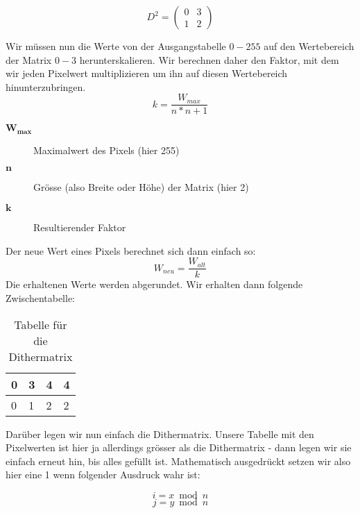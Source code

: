 \begin{displaymath}
D^2 = \begin{pmatrix}
0 & 3 \\
1 & 2
\end{pmatrix}
\end{displaymath}

Wir müssen nun die Werte von der Ausgangstabelle \(0-255\) auf den Wertebereich der Matrix \(0-3\) herunterskalieren. Wir berechnen daher den Faktor, mit dem wir jeden Pixelwert multiplizieren um ihn auf diesen Wertebereich hinunterzubringen.
\begin{displaymath}
k = \frac{W_{max}}{n*n+1}
\end{displaymath}

\begin{description}
	\item[\(\mathbf{W_{max}}\)] Maximalwert des Pixels (hier 255)
	\item[\(\mathbf{n}\)] Grösse (also Breite oder Höhe) der Matrix (hier 2)
	\item[\(\mathbf{k}\)] Resultierender Faktor
\end{description}
Der neue Wert eines Pixels berechnet sich dann einfach so:
\begin{displaymath}
    W_{neu} =  \frac{W_{alt}}{k}
\end{displaymath}
Die erhaltenen Werte werden abgerundet. Wir erhalten dann folgende Zwischentabelle:

\begin{table}[!ht]
	\centering
	\caption{Tabelle für die Dithermatrix}
	\label{tbl:zwischentabelle}
	\begin{tabular}{|l|l|l|l|}
		\hline
		0 & 3 & 4 & 4 \\ \hline
		0  & 1  & 2 & 2 \\ 
		\hline
	\end{tabular}
\end{table}
Darüber legen wir nun einfach die Dithermatrix. Unsere Tabelle mit den Pixelwerten ist hier ja allerdings grösser als die Dithermatrix - dann legen wir sie einfach erneut hin, bis alles gefüllt ist. Mathematisch ausgedrückt setzen wir also hier eine 1 wenn folgender Ausdruck wahr ist:

\begin{displaymath}
	i = x \bmod n
\end{displaymath}
\begin{displaymath}
	j = y \bmod n
\end{displaymath}

